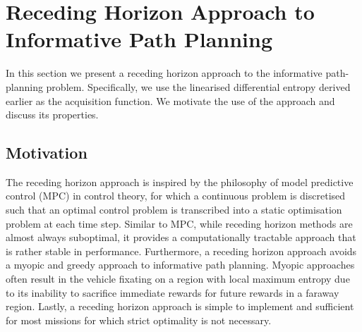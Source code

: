\documentclass{article}
\begin{document}
\section{Receding Horizon Approach to Informative Path Planning}
\label{Section:RecedingHorizonFormulation}

	In this section we present a receding horizon approach to the informative path-planning problem. Specifically, we use the linearised differential entropy derived earlier as the acquisition function. We motivate the use of the approach and discuss its properties.
	
	\subsection{Motivation}
	
		The receding horizon approach is inspired by the philosophy of model predictive control (MPC) in control theory, for which a continuous problem is discretised such that an optimal control problem is transcribed into a static optimisation problem at each time step. Similar to MPC, while receding horizon methods are almost always suboptimal, it provides a computationally tractable approach that is rather stable in performance. Furthermore, a receding horizon approach avoids a myopic and greedy approach to informative path planning. Myopic approaches often result in the vehicle fixating on a region with local maximum entropy due to its inability to sacrifice immediate rewards for future rewards in a faraway region. Lastly, a receding horizon approach is simple to implement and sufficient for most missions for which strict optimality is not necessary.
		
\end{document}
